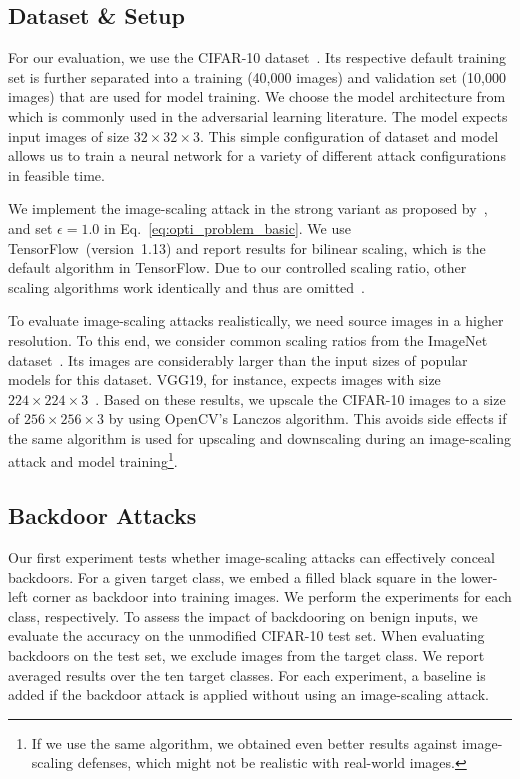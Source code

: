 \documentclass[conference]{IEEEtran}
\begin{document}
\subsection{Dataset \& Setup}
For our evaluation, we use the CIFAR-10 dataset~\citep{KriHin09}. Its 
respective default training set is further separated into a training 
(40,000 images) and validation set (10,000 images) that are used for 
model training. We choose the model architecture from \citet{CarWag17} 
which is commonly used in the adversarial learning literature. The 
model expects input images of size $32 \times 32 \times 3$. This 
simple configuration of dataset and model allows us to train a neural 
network for a variety of different attack configurations in feasible 
time. 

We implement the image-scaling attack in the strong variant as proposed 
by~\citet{XiaCheShe+19}, and set $\epsilon=1.0$ in 
Eq.~\eqref{eq:opti_problem_basic}. 
We use TensorFlow~(version~1.13) and report results for bilinear 
scaling, which is the default algorithm in TensorFlow. Due to our 
controlled scaling ratio, other scaling algorithms work identically and 
thus are omitted~\citep[see][]{QuiKleArp20}.

To evaluate image-scaling attacks realistically, we need source images 
in a higher resolution. To this end, we consider common scaling ratios 
from the ImageNet dataset~\citep{RusDenSu+15}. Its images are 
considerably larger than the input sizes of popular models for this 
dataset. VGG19, for instance, expects images with size $224 \times 224 
\times 3$~\citep{SimZis14}. Based on these results, 
we upscale the CIFAR-10 images to a size of $256 \times 256 \times 
3$ by using OpenCV's Lanczos algorithm. This avoids side effects if 
the same algorithm is used for upscaling and downscaling during an 
image-scaling attack and model training\footnote{If we use the same 
algorithm, we obtained even better results against image-scaling 
defenses, which might not be realistic with real-world images.}.

\subsection{Backdoor Attacks}
Our first experiment tests whether image-scaling attacks can 
effectively conceal backdoors. For a given target class, we
embed a filled black square in the lower-left corner as backdoor into 
training images. We perform the experiments for each class, 
respectively. To assess the impact of backdooring on benign inputs, we 
evaluate the accuracy on the unmodified CIFAR-10 test set. When 
evaluating backdoors on the test set, we exclude images from the target 
class. We report averaged results over the ten target 
classes. For each experiment, a baseline is added if the backdoor 
attack is applied without using an image-scaling attack.
\end{document}
